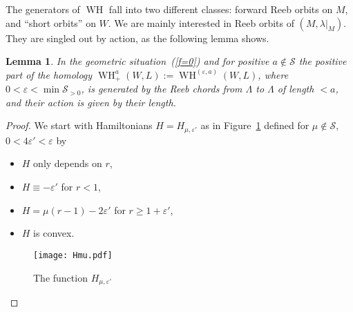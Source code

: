 \documentclass{amsart}
\newcommand{\Scal}{{\mathcal{S}}}
\newcommand{\WslantH}{\operatorname{WH}}
\newtheorem{lemma}[proposition]{Lemma}
\theoremstyle{definition}
\theoremstyle{remark}
\numberwithin{equation}{section}
\begin{document}
The generators of $\WslantH$ fall into two different classes: forward Reeb orbits on $M$, and ``short orbits'' on $W$. We are mainly interested in Reeb orbits of $(M,\lambda|_M)$. They are singled out by action, as the following lemma shows. 
\begin{lemma}\label{cut0off}
	In the geometric situation~(\ref{f=0}) and for positive $a\notin\Scal$ the positive part of the homology $\WslantH_+^{a}(W,L):=\WslantH^{(\varepsilon, a)}(W,L)$, where $0<\varepsilon<\min\Scal_{>0}$, is generated by the Reeb chords from $\Lambda$ to $\Lambda$ of length $<a$, and their action is given by their length.
\end{lemma}
\begin{proof}
	We start with Hamiltonians $H=H_{\mu,\varepsilon'}$ as in Figure~\ref{fig:Hmu} defined for $\mu\notin\Scal,$ $0<4\varepsilon'<\varepsilon$ by 
\begin{itemize}
	\item $H$ only depends on $r$,
	\item $H\equiv -\varepsilon'$ for $r<1$,
	\item $H=\mu(r-1)-2\varepsilon'$ for $r\geq1+\varepsilon'$,
	\item $H$ is convex.
\end{itemize}


\begin{figure}[h]
	\centering
		\texttt{[image: Hmu.pdf]}
	\caption{The function $H_{\mu,\varepsilon'}$}
	\label{fig:Hmu}
\end{figure}


\end{proof}
\end{document}
